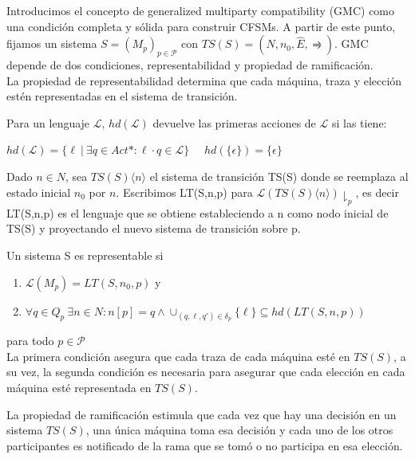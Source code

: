 Introducimos el concepto de generalized multiparty compatibility (GMC) como una condición completa y sólida para construir CFSMs. 
A partir de este punto, fijamos un sistema $S =(M_p)_{p \in \mathcal{P}} $ con $TS(S)= (N, n_0, \hat{E}, \rightrightharpoons)$. GMC depende de dos condiciones, representabilidad y propiedad de ramificación.\\

La propiedad de representabilidad determina que cada máquina, traza y elección estén representadas en el sistema de transición.

\begin{definition}Para un lenguaje $\mathcal{L}$, $hd(\mathcal{L})$ devuelve las primeras acciones de $\mathcal{L}$ si las tiene: 
\begin{center}
$hd(\mathcal{L})= \{\ell \ | \ \exists q \in Act*: \ell \cdot q \in \mathcal{L} \}$	\ \	 $hd(\{ \epsilon \}) = \{ \epsilon \}$
\end{center}
Dado $n \in N$, sea $ TS(S)\langle n \rangle$ el sistema de transición TS(S) donde se reemplaza al estado inicial $n_0$ por $n$. Escribimos LT(S,n,p) para $\mathcal{L}(TS(S)\langle n \rangle)\downharpoonright_p $, es decir LT(S,n,p) es el lenguaje que se obtiene estableciendo a n como nodo inicial de TS(S) y proyectando el nuevo sistema de transición sobre p.
\end{definition}

\begin{definition}[Representabilidad]Un sistema S es representable si
\begin{enumerate}
\item $\mathcal{L}(M_p) = LT(S,n_0,p) $ y
\item $\forall q \in Q_p \ \exists n \in N: n[p] = q \land  \cup_{(q,\ell, q') \in \delta_p} \{ \ell \} \subseteq hd (LT(S,n,p))$
\end{enumerate}
para todo $p \in \mathcal{P} $ \\

La primera condición asegura que cada traza de cada máquina esté en $TS(S)$, a su vez, la segunda condición es necesaria para asegurar que cada elección en cada máquina esté representada en $TS(S)$.
\end{definition}

La propiedad de ramificación estimula que cada vez que hay una decisión en un sistema $TS(S)$, una única máquina toma esa decisión y cada uno de los otros participantes es notificado de la rama que se tomó o no participa en esa elección. 
 

